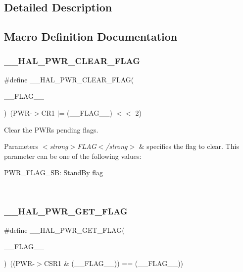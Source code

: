 \subsection{Detailed Description}


\subsection{Macro Definition Documentation}
\mbox{\label{group___p_w_r___exported___macro_ga96f24bf4b16c9f944cd829100bf746e5}} 
\subsubsection{\texorpdfstring{\_\_HAL\_PWR\_CLEAR\_FLAG}{\_\_HAL\_PWR\_CLEAR\_FLAG}}
{\footnotesize\ttfamily \#define \+\_\+\+\_\+\+H\+A\+L\+\_\+\+P\+W\+R\+\_\+\+C\+L\+E\+A\+R\+\_\+\+F\+L\+AG(\begin{DoxyParamCaption}\item[{}]{\+\_\+\+\_\+\+F\+L\+A\+G\+\_\+\+\_\+ }\end{DoxyParamCaption})~(P\+WR-\/$>$C\+R1 $\vert$=  (\+\_\+\+\_\+\+F\+L\+A\+G\+\_\+\+\_\+) $<$$<$ 2)}



Clear the P\+WR\textquotesingle{}s pending flags. 


\begin{DoxyParams}{Parameters}
{\em $<$strong$>$\+F\+L\+A\+G$<$/strong$>$} & specifies the flag to clear. This parameter can be one of the following values\+: \begin{DoxyItemize}
\item P\+W\+R\+\_\+\+F\+L\+A\+G\+\_\+\+SB\+: Stand\+By flag \end{DoxyItemize}
\\
\hline
\end{DoxyParams}
\mbox{\label{group___p_w_r___exported___macro_ga2977135bbea35b786805eea640d1c884}} 
\subsubsection{\texorpdfstring{\_\_HAL\_PWR\_GET\_FLAG}{\_\_HAL\_PWR\_GET\_FLAG}}
{\footnotesize\ttfamily \#define \+\_\+\+\_\+\+H\+A\+L\+\_\+\+P\+W\+R\+\_\+\+G\+E\+T\+\_\+\+F\+L\+AG(\begin{DoxyParamCaption}\item[{}]{\+\_\+\+\_\+\+F\+L\+A\+G\+\_\+\+\_\+ }\end{DoxyParamCaption})~((P\+WR-\/$>$C\+S\+R1 \& (\+\_\+\+\_\+\+F\+L\+A\+G\+\_\+\+\_\+)) == (\+\_\+\+\_\+\+F\+L\+A\+G\+\_\+\+\_\+))}



